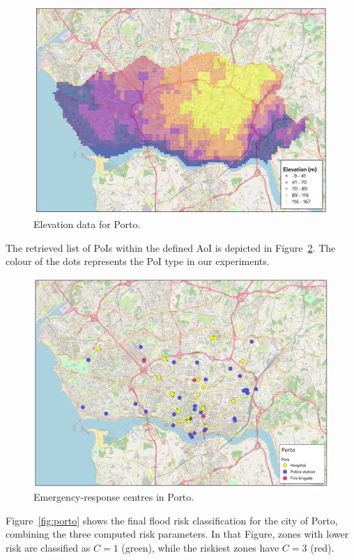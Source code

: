 \begin{refsection}
\begin{figure}[ht]
  \centering
  \includegraphics[width=0.9\linewidth]{Chapters/6-Flood/figs/porto_elevation.pdf}
  \caption{Elevation data for Porto.}\label{fig:porto_elevation}
\end{figure}

The retrieved list of PoIs within the defined AoI is depicted in Figure~\ref{fig:poisporto}. The colour of the dots represents the PoI type in our experiments. 

\begin{figure}[ht]
  \centering
  \includegraphics[width=0.9\linewidth]{Chapters/6-Flood/figs/porto_pois.pdf}
  \caption{Emergency-response centres in Porto.}\label{fig:poisporto}
\end{figure}

Figure~\ref{fig:porto} shows the final flood risk classification for the city of Porto, combining the three computed risk parameters. In that Figure, zones with lower risk are classified as $C=1$ (green), while the riskiest zones have $C=3$ (red).


\end{refsection}
